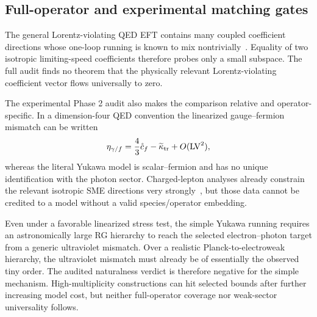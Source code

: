 \documentclass[11pt,a4paper]{article}
\begin{document}
\subsection{Full-operator and experimental matching gates}
The general Lorentz-violating QED EFT contains many coupled coefficient directions whose one-loop running is known to mix nontrivially~\cite{klp2002}.  Equality of two isotropic limiting-speed coefficients therefore probes only a small subspace.  The full audit finds no theorem that the physically relevant Lorentz-violating coefficient vector flows universally to zero.

The experimental Phase 2 audit also makes the comparison relative and operator-specific.  In a dimension-four QED convention the linearized gauge--fermion mismatch can be written
\begin{equation}
\eta_{\gamma/f}=\frac{4}{3}\mathring c_f-\widetilde\kappa_{\rm tr}+O(\mathrm{LV}^2),
\end{equation}
whereas the literal Yukawa model is scalar--fermion and has no unique identification with the photon sector.  Charged-lepton analyses already constrain the relevant isotropic SME directions very strongly~\cite{cks2022}, but those data cannot be credited to a model without a valid species/operator embedding.

Even under a favorable linearized stress test, the simple Yukawa running requires an astronomically large RG hierarchy to reach the selected electron--photon target from a generic ultraviolet mismatch. Over a realistic Planck-to-electroweak hierarchy, the ultraviolet mismatch must already be of essentially the observed tiny order.  The audited naturalness verdict is therefore negative for the simple mechanism.  High-multiplicity constructions can hit selected bounds after further increasing model cost, but neither full-operator coverage nor weak-sector universality follows.
\end{document}
